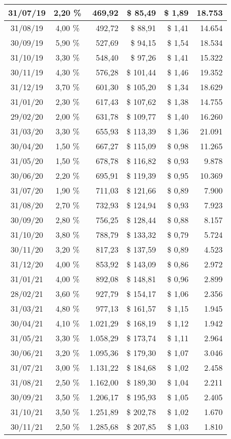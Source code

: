 \begin{center}
\begin{longtable}{|c|c|r|r|r|r|}
31/07/19 & 2,20 \% & 469,92 & \$ 85,49 & \$ 1,89 & 18.753 \\ \hline
31/08/19 & 4,00 \% & 492,72 & \$ 88,91 & \$ 1,41 & 14.654 \\ \hline
30/09/19 & 5,90 \% & 527,69 & \$ 94,15 & \$ 1,54 & 18.534 \\ \hline
31/10/19 & 3,30 \% & 548,40 & \$ 97,26 & \$ 1,41 & 15.322 \\ \hline
30/11/19 & 4,30 \% & 576,28 & \$ 101,44 & \$ 1,46 & 19.352 \\ \hline
31/12/19 & 3,70 \% & 601,30 & \$ 105,20 & \$ 1,34 & 18.629 \\ \hline
31/01/20 & 2,30 \% & 617,43 & \$ 107,62 & \$ 1,38 & 14.755 \\ \hline
29/02/20 & 2,00 \% & 631,78 & \$ 109,77 & \$ 1,40 & 16.260 \\ \hline
31/03/20 & 3,30 \% & 655,93 & \$ 113,39 & \$ 1,36 & 21.091 \\ \hline
30/04/20 & 1,50 \% & 667,27 & \$ 115,09 & \$ 0,98 & 11.265 \\ \hline
31/05/20 & 1,50 \% & 678,78 & \$ 116,82 & \$ 0,93 & 9.878 \\ \hline
30/06/20 & 2,20 \% & 695,91 & \$ 119,39 & \$ 0,95 & 10.369 \\ \hline
31/07/20 & 1,90 \% & 711,03 & \$ 121,66 & \$ 0,89 & 7.900 \\ \hline
31/08/20 & 2,70 \% & 732,93 & \$ 124,94 & \$ 0,93 & 7.923 \\ \hline
30/09/20 & 2,80 \% & 756,25 & \$ 128,44 & \$ 0,88 & 8.157 \\ \hline
31/10/20 & 3,80 \% & 788,79 & \$ 133,32 & \$ 0,79 & 5.724 \\ \hline
30/11/20 & 3,20 \% & 817,23 & \$ 137,59 & \$ 0,89 & 4.523 \\ \hline
31/12/20 & 4,00 \% & 853,92 & \$ 143,09 & \$ 0,86 & 2.972 \\ \hline
31/01/21 & 4,00 \% & 892,08 & \$ 148,81 & \$ 0,96 & 2.899 \\ \hline
28/02/21 & 3,60 \% & 927,79 & \$ 154,17 & \$ 1,06 & 2.356 \\ \hline
31/03/21 & 4,80 \% & 977,13 & \$ 161,57 & \$ 1,15 & 1.945 \\ \hline
30/04/21 & 4,10 \% & 1.021,29 & \$ 168,19 & \$ 1,12 & 1.942 \\ \hline
31/05/21 & 3,30 \% & 1.058,29 & \$ 173,74 & \$ 1,11 & 2.964 \\ \hline
30/06/21 & 3,20 \% & 1.095,36 & \$ 179,30 & \$ 1,07 & 3.046 \\ \hline
31/07/21 & 3,00 \% & 1.131,22 & \$ 184,68 & \$ 1,02 & 2.458 \\ \hline
31/08/21 & 2,50 \% & 1.162,00 & \$ 189,30 & \$ 1,04 & 2.211 \\ \hline
30/09/21 & 3,50 \% & 1.206,17 & \$ 195,93 & \$ 1,05 & 2.405 \\ \hline
31/10/21 & 3,50 \% & 1.251,89 & \$ 202,78 & \$ 1,02 & 1.670 \\ \hline
30/11/21 & 2,50 \% & 1.285,68 & \$ 207,85 & \$ 1,03 & 1.810 \\ \hline
\end{longtable}
\end{center}

